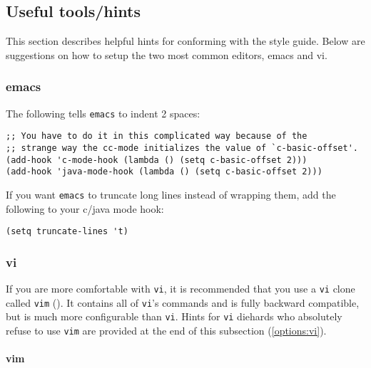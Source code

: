 \subsection {Useful tools/hints}

This section describes helpful hints for conforming with the style
guide.  Below are suggestions on how to setup the two most common
editors, emacs and vi. 

\subsubsection{emacs} 

The following tells {\tt emacs} to indent 2 spaces:
\begin{verbatim}
;; You have to do it in this complicated way because of the
;; strange way the cc-mode initializes the value of `c-basic-offset'.
(add-hook 'c-mode-hook (lambda () (setq c-basic-offset 2)))
(add-hook 'java-mode-hook (lambda () (setq c-basic-offset 2)))
\end{verbatim}
If you want {\tt emacs} to truncate long lines instead of wrapping them, add
the following to your c/java mode hook:
\begin{verbatim}
(setq truncate-lines 't)
\end{verbatim}

\subsubsection{vi}\label{options:vi/vim}

If you are more comfortable with {\tt vi}, it is recommended that you
use a {\tt vi} clone called {\tt vim} 
(\xlink{{\tt \VimURL}}{\VimURL}).  It
contains all of {\tt vi}'s commands and is fully backward compatible,
but is much more configurable than {\tt vi}.  Hints for {\tt vi}
diehards who absolutely refuse to use {\tt vim} are provided at the end
of this subsection (\ref{options:vi}).

\paragraph{vim}\label{options:vim}

